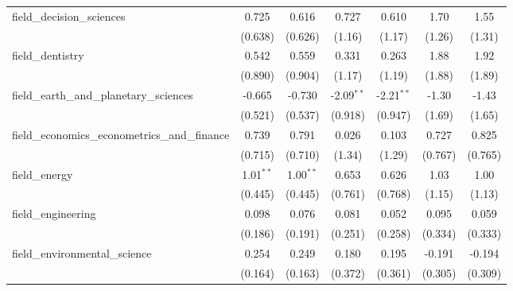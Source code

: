 \begin{tabular}{lcccccc}
   field\_decision\_sciences                                   & 0.725         & 0.616        & 0.727        & 0.610        & 1.70           & 1.55\\   
                                                               & (0.638)       & (0.626)      & (1.16)       & (1.17)       & (1.26)         & (1.31)\\   
   field\_dentistry                                            & 0.542         & 0.559        & 0.331        & 0.263        & 1.88           & 1.92\\   
                                                               & (0.890)       & (0.904)      & (1.17)       & (1.19)       & (1.88)         & (1.89)\\   
   field\_earth\_and\_planetary\_sciences                      & -0.665        & -0.730       & -2.09$^{**}$ & -2.21$^{**}$ & -1.30          & -1.43\\   
                                                               & (0.521)       & (0.537)      & (0.918)      & (0.947)      & (1.69)         & (1.65)\\   
   field\_economics\_econometrics\_and\_finance                & 0.739         & 0.791        & 0.026        & 0.103        & 0.727          & 0.825\\   
                                                               & (0.715)       & (0.710)      & (1.34)       & (1.29)       & (0.767)        & (0.765)\\   
   field\_energy                                               & 1.01$^{**}$   & 1.00$^{**}$  & 0.653        & 0.626        & 1.03           & 1.00\\   
                                                               & (0.445)       & (0.445)      & (0.761)      & (0.768)      & (1.15)         & (1.13)\\   
   field\_engineering                                          & 0.098         & 0.076        & 0.081        & 0.052        & 0.095          & 0.059\\   
                                                               & (0.186)       & (0.191)      & (0.251)      & (0.258)      & (0.334)        & (0.333)\\   
   field\_environmental\_science                               & 0.254         & 0.249        & 0.180        & 0.195        & -0.191         & -0.194\\   
                                                               & (0.164)       & (0.163)      & (0.372)      & (0.361)      & (0.305)        & (0.309)\\   

\end{tabular}

